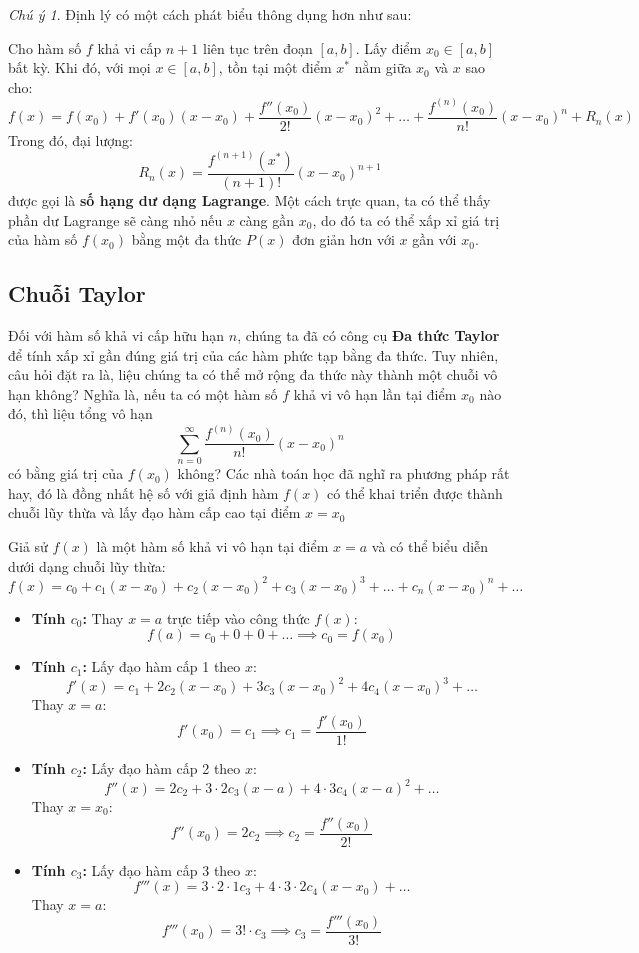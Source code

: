 \documentclass[12pt]{article}
\theoremstyle{definition}
\theoremstyle{remark}
\newtheorem*{remark}{Chú ý}
\begin{document}
\begin{remark}
Định lý có một cách phát biểu thông dụng hơn như sau:

Cho hàm số $f$ khả vi cấp $n + 1$ liên tục trên đoạn $[a, b]$. Lấy điểm $x_0 \in [a, b]$ bất kỳ. Khi đó, với mọi $x \in [a, b]$, tồn tại một điểm $x^*$ nằm giữa $x_0$ và $x$ sao cho:
\[
f(x) = f(x_0) + f'(x_0)(x - x_0) + \frac{f''(x_0)}{2!}(x - x_0)^2 + \dots + \frac{f^{(n)}(x_0)}{n!}(x - x_0)^n + R_n(x)
\]
Trong đó, đại lượng:
\[
R_n(x) = \frac{f^{(n+1)}(x^*)}{(n+1)!}(x - x_0)^{n+1}
\]
được gọi là \textbf{số hạng dư dạng Lagrange}. Một cách trực quan, ta có thể thấy phần dư Lagrange sẽ càng nhỏ nếu $x$ càng gần $x_0$, do đó ta có thể xấp xỉ giá trị của hàm số $f(x_0)$ bằng một đa thức $P(x)$ đơn giản hơn với $x$ gần với $x_0$.
\end{remark}
\subsection{Chuỗi Taylor}
Đối với hàm số khả vi cấp hữu hạn $n$, chúng ta đã có công cụ \textbf{Đa thức Taylor} để tính xấp xỉ gần đúng giá trị của các hàm phức tạp bằng đa thức. Tuy nhiên, câu hỏi đặt ra là, liệu chúng ta có thể mở rộng đa thức này thành một chuỗi vô hạn không? Nghĩa là, nếu ta có một hàm số $f$ khả vi vô hạn lần tại điểm $x_0$ nào đó, thì liệu tổng vô hạn 
\begin{equation}
    \sum_{n=0}^{\infty} \frac{f^{(n)}(x_0)}{n!} (x - x_0)^n
\end{equation}
có bằng giá trị của $f(x_0)$ không? Các nhà toán học  đã nghĩ ra phương pháp rất hay, đó là đồng nhất hệ số với giả định hàm $f(x)$ có thể khai triển được thành chuỗi lũy thừa và lấy đạo hàm cấp cao tại điểm $x=x_0$

Giả sử $f(x)$ là một hàm số khả vi vô hạn tại điểm $x = a$ và có thể biểu diễn dưới dạng chuỗi lũy thừa:
\[
f(x) = c_0 + c_1(x-x_0) + c_2(x-x_0)^2 + c_3(x-x_0)^3 + \dots + c_n(x-x_0)^n + \dots
\]



\begin{itemize}
    \item \textbf{Tính $c_0$:} Thay $x = a$ trực tiếp vào công thức $f(x)$:
    \[
    f(a) = c_0 + 0 + 0 + \dots \implies c_0 = f(x_0)
    \]

    \item \textbf{Tính $c_1$:} Lấy đạo hàm cấp 1 theo $x$:
    \[
    f'(x) = c_1 + 2c_2(x-x_0) + 3c_3(x-x_0)^2 + 4c_4(x-x_0)^3 + \dots
    \]
    Thay $x = a$:
    \[
    f'(x_0) = c_1 \implies c_1 = \frac{f'(x_0)}{1!}
    \]

    \item \textbf{Tính $c_2$:} Lấy đạo hàm cấp 2 theo $x$:
    \[
    f''(x) = 2c_2 + 3 \cdot 2 c_3(x-a) + 4 \cdot 3 c_4(x-a)^2 + \dots
    \]
    Thay $x = x_0$:
    \[
    f''(x_0) = 2c_2 \implies c_2 = \frac{f''(x_0)}{2!}
    \]

    \item \textbf{Tính $c_3$:} Lấy đạo hàm cấp 3 theo $x$:
    \[
    f'''(x) = 3 \cdot 2 \cdot 1 c_3 + 4 \cdot 3 \cdot 2 c_4(x-x_0) + \dots
    \]
    Thay $x = a$:
    \[
    f'''(x_0) = 3! \cdot c_3 \implies c_3 = \frac{f'''(x_0)}{3!}
    \]
\end{itemize}
\end{document}
